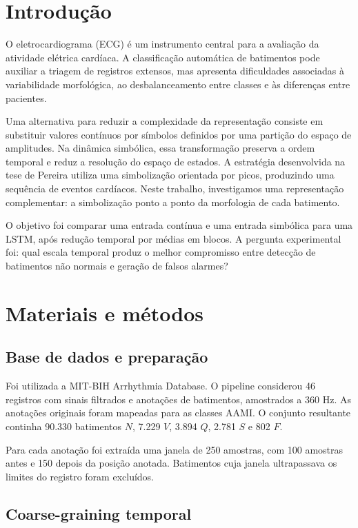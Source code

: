 \documentclass[12pt,a4paper]{article}
\begin{document}
\section{Introdução}

O eletrocardiograma (ECG) é um instrumento central para a avaliação da atividade elétrica cardíaca. A classificação automática de batimentos pode auxiliar a triagem de registros extensos, mas apresenta dificuldades associadas à variabilidade morfológica, ao desbalanceamento entre classes e às diferenças entre pacientes.

Uma alternativa para reduzir a complexidade da representação consiste em substituir valores contínuos por símbolos definidos por uma partição do espaço de amplitudes. Na dinâmica simbólica, essa transformação preserva a ordem temporal e reduz a resolução do espaço de estados. A estratégia desenvolvida na tese de Pereira utiliza uma simbolização orientada por picos, produzindo uma sequência de eventos cardíacos. Neste trabalho, investigamos uma representação complementar: a simbolização ponto a ponto da morfologia de cada batimento.

O objetivo foi comparar uma entrada contínua e uma entrada simbólica para uma LSTM, após redução temporal por médias em blocos. A pergunta experimental foi: qual escala temporal produz o melhor compromisso entre detecção de batimentos não normais e geração de falsos alarmes?

\section{Materiais e métodos}

\subsection{Base de dados e preparação}

Foi utilizada a MIT-BIH Arrhythmia Database. O pipeline considerou 46 registros com sinais filtrados e anotações de batimentos, amostrados a 360 Hz. As anotações originais foram mapeadas para as classes AAMI. O conjunto resultante continha 90.330 batimentos $N$, 7.229 $V$, 3.894 $Q$, 2.781 $S$ e 802 $F$.

Para cada anotação foi extraída uma janela de 250 amostras, com 100 amostras antes e 150 depois da posição anotada. Batimentos cuja janela ultrapassava os limites do registro foram excluídos.

\subsection{Coarse-graining temporal}
\end{document}
